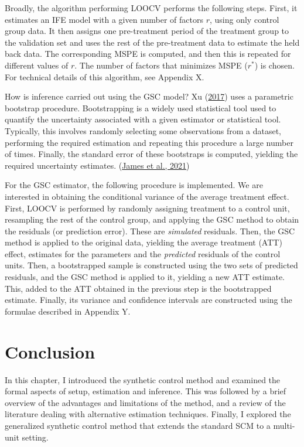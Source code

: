 \documentclass[12pt,nobind, a4paper]{reedthesis}
\begin{document}
 Broadly, the algorithm performing LOOCV performs the following steps. First, it estimates an IFE model with a given number of factors \(r\), using only control group data. It then assigns one pre-treatment period of the treatment group to the validation set and uses the rest of the pre-treatment data to estimate the held back data. The corresponding MSPE is computed, and then this is repeated for different values of \(r\). The number of factors that minimizes MSPE (\(r^{*}\)) is chosen. For technical details of this algorithm, see Appendix X.
 \linebreak

 How is inference carried out using the GSC model? Xu (\protect\hyperlink{ref-xu_generalized_2017}{2017}) uses a parametric bootstrap procedure. Bootstrapping is a widely used statistical tool used to quantify the uncertainty associated with a given estimator or statistical tool. Typically, this involves randomly selecting some observations from a dataset, performing the required estimation and repeating this procedure a large number of times. Finally, the standard error of these bootstraps is computed, yielding the required uncertainty estimates. (\protect\hyperlink{ref-james_introduction_2021}{James et al., 2021})
 \linebreak

 For the GSC estimator, the following procedure is implemented. We are interested in obtaining the conditional variance of the average treatment effect. First, LOOCV is performed by randomly assigning treatment to a control unit, resampling the rest of the control group, and applying the GSC method to obtain the residuals (or prediction error). These are \textit{simulated} residuals. Then, the GSC method is applied to the original data, yielding the average treatment (ATT) effect, estimates for the parameters and the \textit{predicted} residuals of the control units. Then, a bootstrapped sample is constructed using the two sets of predicted residuals, and the GSC method is applied to it, yielding a new ATT estimate. This, added to the ATT obtained in the previous step is the bootstrapped estimate. Finally, its variance and confidence intervals are constructed using the formulae described in Appendix Y.

 \hypertarget{conclusion}{%
 \section{Conclusion}\label{conclusion}}

 In this chapter, I introduced the synthetic control method and examined the formal aspects of setup, estimation and inference. This was followed by a brief overview of the advantages and limitations of the method, and a review of the literature dealing with alternative estimation techniques. Finally, I explored the generalized synthetic control method that extends the standard SCM to a multi-unit setting.
 \linebreak
\end{document}
